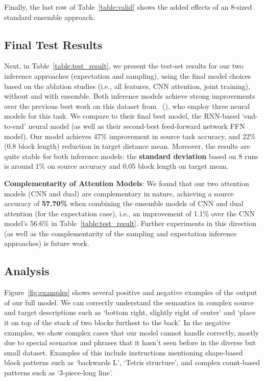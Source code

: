 \documentclass[letterpaper]{article} %
\newcommand{\newcite}[1]{\citeauthor{#1} (\citeyear{#1})}
\begin{document}
Finally, the last row of Table~\ref{table:valid} shows the added effects of an 8-sized standard ensemble approach.


\vspace{-1.65mm}
\subsection{Final Test Results}
\label{sec:finaltest}
Next, in Table~\ref{table:test_result}, we present the test-set results for our two inference approaches (expectation and sampling), using the final model choices based on the ablation studies (i.e., all features, CNN attention, joint training), without and with ensemble.
Both inference models achieve strong improvements over the previous best work on this dataset from~\newcite{bisk2016natural}, who employ three neural models for this task. We compare to their final best model, the RNN-based `end-to-end' neural model (as well as their second-best feed-forward network FFN model).
Our model achieves 47\% improvement in source task accuracy, and 22\% (0.8 block length) reduction in target distance mean.
Moreover, the results are quite stable for both inference models: the \textbf{standard deviation} based on 8 runs is around 1\% on source accuracy and 0.05 block length on target mean.

\textbf{Complementarity of Attention Models}:
We found that our two attention models (CNN and dual) are complementary in nature, achieving a source accuracy of \textbf{57.70\%} when combining the ensemble models of CNN and dual attention (for the expectation case), i.e., an improvement of 1.1\% over the CNN model's 56.6\% in Table~\ref{table:test_result}.
Further experiments in this direction (as well as the complementarity of the sampling and expectation inference approaches) is future work.



\vspace{-1.52mm}
\subsection{Analysis}
Figure~\ref{fig:examples} shows several positive and negative examples of the output of our full model. We can correctly understand the semantics in complex source and target descriptions such as `bottom right, slightly right of center' and `place it on top of the stack of two blocks furthest to the back'. In the negative examples, we show complex cases that our model cannot handle correctly, mostly due to special scenarios and phrases that it hasn't seen before in the diverse but small dataset. Examples of this include instructions mentioning shape-based block patterns such as `backwards L', `Tetris structure', and complex count-based patterns such as `3-piece-long line'.
\end{document}
